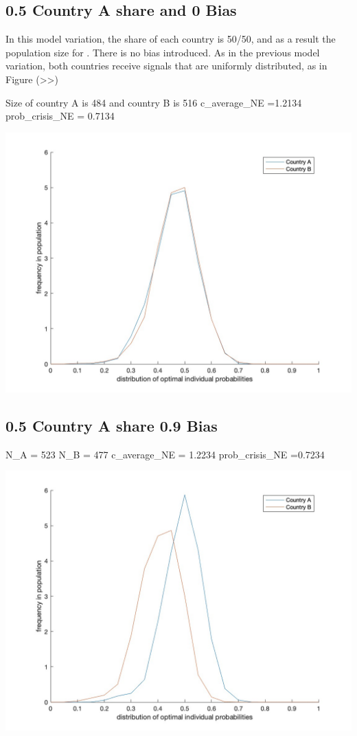\documentclass[11pt,preprint, authoryear]{elsarticle}
\let\origfigure\figure
\let\endorigfigure\endfigure
\renewenvironment{figure}[1][2] {
    \expandafter\origfigure\expandafter[H]
} {
    \endorigfigure
}
\numberwithin{equation}{section}
\numberwithin{figure}{section}
\numberwithin{table}{section}
\begin{document}
\hypertarget{country-a-share-and-0-bias}{%
\subsection*{0.5 Country A share and 0
Bias}\label{country-a-share-and-0-bias}}

In this model variation, the share of each country is 50/50, and as a
result the population size for . There is no bias introduced. As in the
previous model variation, both countries receive signals that are
uniformly distributed, as in Figure (\textgreater\textgreater)

Size of country A is 484 and country B is 516 c\_average\_NE =1.2134
prob\_crisis\_NE = 0.7134

\begin{figure}[H]

{\centering \includegraphics[width=0.45\linewidth]{images/Fig4_0.5Size0Bias} 

}

\caption{50/50 country split model: Kernel density function of the distribution of the optimal probabilty of crisis and frequency thereof across individuals in country A and country B}\label{fig:unnamed-chunk-6}
\end{figure}

\hypertarget{country-a-share-0.9-bias}{%
\subsection*{0.5 Country A share 0.9
Bias}\label{country-a-share-0.9-bias}}

N\_A = 523 N\_B = 477 c\_average\_NE = 1.2234 prob\_crisis\_NE =0.7234

\begin{figure}[H]

{\centering \includegraphics[width=0.45\linewidth]{images/Fig4_0.5Size0.9Bias} 

}

\caption{0.9 Country A bias model: Kernel density function of the distribution of the optimal probabilty of crisis and frequency thereof across individuals in country A and country B}\label{fig:unnamed-chunk-7}
\end{figure}
\end{document}
